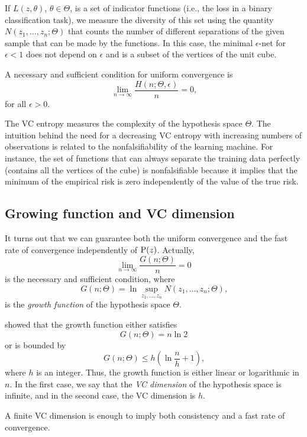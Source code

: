 If $L(z, \theta)$, $\theta \in \Theta$, is a set of indicator functions (i.e., the loss in a binary
classification task),  we measure the diversity of this set using the quantity $N(z_1,
\dots, z_n; \Theta)$ that counts the number of different separations of the given sample
that can be made by the functions.  In this case, the minimal $\epsilon$-net for $\epsilon < 1$
does not depend on $\epsilon$ and is a subset of the vertices of the unit cube.

A necessary and sufficient condition for uniform convergence is
\begin{equation}
  \label{eq:uniform-convergence}
  \lim_{n \to \infty} \frac{H(n; \Theta, \epsilon)}{n} = 0\text{,}
\end{equation}
for all $\epsilon > 0$.

The VC entropy measures the complexity of the hypothesis space $\Theta$.  The intuition
behind the need for a decreasing VC entropy with increasing numbers of observations is
related to the nonfalsifiability of the learning machine.  For instance, the set of
functions that can always separate the training data perfectly (contains all the vertices
of the cube) is nonfalsifiable because
it implies that the minimum of the empirical risk is zero independently of the value of
the true risk.

\subsection{Growing function and VC dimension}
\label{sub:vc-dimension}

It turns out that we can guarantee both the uniform convergence and the fast rate of
convergence independently of $\operatorname{P}(z)$.  Actually,
\[
  \lim_{n \to \infty} \frac{G(n; \Theta)}{n} = 0
\]
is the necessary and sufficient condition, where
\[
  G(n; \Theta) = \ln \sup_{z_1, \dots, z_n} N(z_1, \dots, z_n; \Theta)\text{,}
\]
is the \emph{growth function} of the hypothesis space $\Theta$.

\textcite{Vapnik1968} showed that the growth function either
satisfies
\[
  G(n; \Theta) = n \ln 2
\]
or is bounded by
\[
  G(n; \Theta) \leq h \left( \ln \frac{n}{h} + 1 \right)\text{,}
\]
where $h$ is an integer.  Thus, the growth function is either linear or logarithmic in
$n$.  In the first case, we say that the \emph{VC dimension} of the hypothesis space is
infinite, and in the second case, the VC dimension is $h$.

A finite VC dimension is enough to imply both consistency and a fast rate of convergence.

